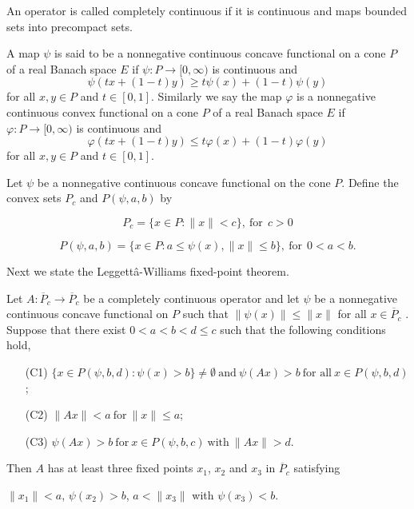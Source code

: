 \documentclass[reqno]{amsart}\usepackage{amsmath}
\begin{document}
\begin{definition}
An operator is called completely continuous if it is continuous and
maps bounded sets into precompact sets.
\end{definition}

\begin{definition}
A map $\psi$ is said to be a nonnegative continuous concave functional
on a cone $P$ of a real Banach space $E$ if $\psi : P\rightarrow [0, \infty)$ is continuous and
\[\psi(tx+(1-t)y)\geq t\psi(x)+(1-t)\psi(y)\]
for all $x, y \in P$ and $t\in [0, 1]$. Similarly we say the map $\varphi$ is a nonnegative
continuous convex functional on a cone $P$ of a real Banach space $E$ if $\varphi : P\rightarrow [0, \infty)$ is continuous and
\[\varphi(tx+(1-t)y) \leq t\varphi(x)+(1-t)\varphi(y)\]
for all $x, y \in P$ and $t\in [0, 1]$.
\end{definition}

\begin{definition}
Let $\psi$  be a nonnegative continuous concave functional on the cone $P$. Define the convex sets $P_{c}$
and $P(\psi, a, b)$ by

\[P_{c}=\{x\in P: \|x\|<c\},\ \text{for}\ \ c>0\]

\[P(\psi, a, b)=\{x\in P: a\leq\psi(x), \|x\|\leq b\},\ \text{for}\ \ 0<a<b. \]
\end{definition}

Next we state the Leggettâ-Williams fixed-point theorem.

\begin{theorem} \label{theo 1.1}

Let $A : \overline{P}_{c}\rightarrow \overline{P}_{c}$ be a completely continuous operator and let $\psi$ be a nonnegative continuous concave functional on $P$ such that $\|\psi(x)\|\leq \|x\|$ for all $x\in \overline{P}_{c}$ . Suppose that there exist $0 < a < b < d \leq c $ such that the following conditions hold,

\begin{itemize}
\item[(C1)] $\{x \in P(\psi, b, d):  \psi(x) > b\}\neq\emptyset \  \text{and} \ \psi(Ax) > b \ \text{for all}\ x \in P(\psi, b, d)$;

\item[(C2)] $\|Ax\| < a \  \text{for}\ \|x\|\leq a$;

\item[(C3)] $\psi(Ax) > b\ \text{for}\ x \in P(\psi, b, c)\  \text{with}\ \|Ax\| > d$.
\end{itemize}
Then $A$ has at least three fixed points $x_{1}$, $x_{2}$ and $x_{3}$ in $\overline{P}_{c}$ satisfying

$\|x_{1}\| < a$,  $\psi(x_{2}) > b$,  $a < \|x_{3}\|$ with  $\psi(x_{3})< b$.


\end{theorem}
\end{document}
